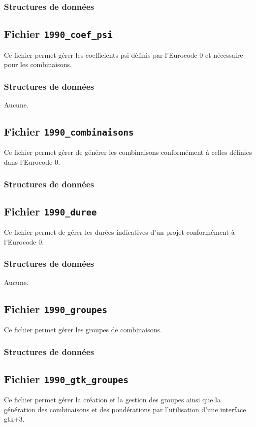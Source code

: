 \documentclass{article}
\begin{document}
\subsubsection{Structures de données}


\subsection{Fichier {\texttt{1990\_coef\_psi}}}
Ce fichier permet gérer les coefficients psi définis par l'Eurocode 0 et nécessaire pour les combinaisons.
\subsubsection{Structures de données}
Aucune.

\subsection{Fichier {\texttt{1990\_combinaisons}}}
Ce fichier permet gérer de générer les combinaisons conformément à celles définies dans l'Eurocode 0.
\subsubsection{Structures de données}


\subsection{Fichier {\texttt{1990\_duree}}}
Ce fichier permet de gérer les durées indicatives d'un projet conformément à l'Eurocode 0.
\subsubsection{Structures de données}
Aucune.

\subsection{Fichier {\texttt{1990\_groupes}}}
Ce fichier permet gérer les groupes de combinaisons.
\subsubsection{Structures de données}


\subsection{Fichier {\texttt{1990\_gtk\_groupes}}}
Ce fichier permet gérer la création et la gestion des groupes ainsi que la génération des combinaisons et des pondérations par l'utilisation d'une interface gtk+3.
\end{document}
